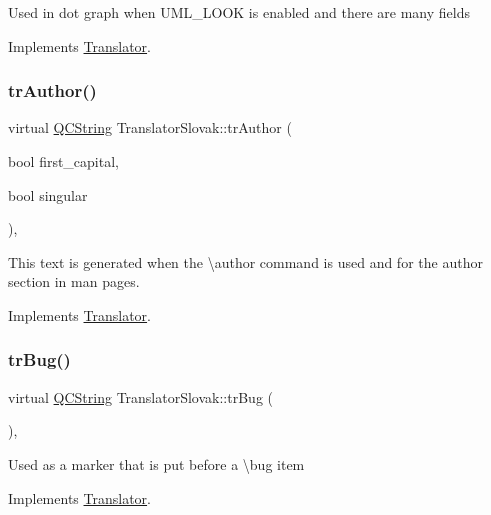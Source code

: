 Used in dot graph when U\+M\+L\+\_\+\+L\+O\+OK is enabled and there are many fields 

Implements \mbox{\hyperlink{class_translator}{Translator}}.

\mbox{\label{class_translator_slovak_a9c291d90d2749994b98a4cc28e3ab19a}} 
\subsubsection{\texorpdfstring{trAuthor()}{trAuthor()}}
{\footnotesize\ttfamily virtual \mbox{\hyperlink{class_q_c_string}{Q\+C\+String}} Translator\+Slovak\+::tr\+Author (\begin{DoxyParamCaption}\item[{bool}]{first\+\_\+capital,  }\item[{bool}]{singular }\end{DoxyParamCaption})\hspace{0.3cm}{\ttfamily [inline]}, {\ttfamily [virtual]}}

This text is generated when the \textbackslash{}author command is used and for the author section in man pages. 

Implements \mbox{\hyperlink{class_translator}{Translator}}.

\mbox{\label{class_translator_slovak_a1af53c61caac370f7d8009fb5ec97e34}} 
\subsubsection{\texorpdfstring{trBug()}{trBug()}}
{\footnotesize\ttfamily virtual \mbox{\hyperlink{class_q_c_string}{Q\+C\+String}} Translator\+Slovak\+::tr\+Bug (\begin{DoxyParamCaption}{ }\end{DoxyParamCaption})\hspace{0.3cm}{\ttfamily [inline]}, {\ttfamily [virtual]}}

Used as a marker that is put before a \textbackslash{}bug item 

Implements \mbox{\hyperlink{class_translator}{Translator}}.

\mbox{\label{class_translator_slovak_a450b655aab60e8b82107fe2fb1eec8bc}} 
